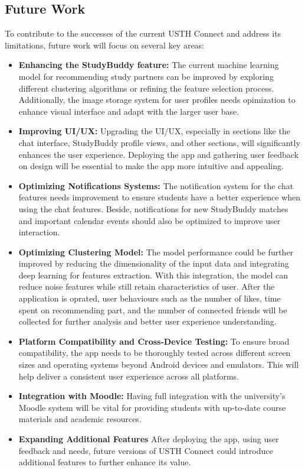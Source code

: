 \documentclass[12pt]{article}
\begin{document}
\subsection{Future Work}
To contribute to the successes of the current USTH Connect and address its limitations, future work will focus on several key areas:
\begin{itemize}
    \item \textbf{Enhancing the StudyBuddy feature: } The current machine learning model for recommending study partners can be improved by exploring different clustering algorithms or refining the feature selection process. Additionally, the image storage system for user profiles needs opimization to enhance visual interface and adapt with the larger user base.
    \item \textbf{Improving UI/UX: } Upgrading the UI/UX, especially in sections like the chat interface, StudyBuddy profile views, and other sections, will significantly enhances the user experience. Deploying the app and gathering user feedback on design will be essential to make the app more intuitive and appealing.
    \item \textbf{Optimizing Notifications Systems: } The notification system for the chat features needs improvement to ensure students have a better experience when using the chat features. Beside, notifications for new StudyBuddy matches and important calendar events should also be optimized to improve user interaction.
    \item \textbf{Optimizing Clustering Model: } The model performance could be further improved by reducing the dimensionality of the input data and integrating deep learning for features extraction. With this integration, the model can reduce noise features while still retain characteristics of user. After the application is oprated, user behaviours such as the number of likes, time spent on recommending part, and the number of connected friends will be collected for further analysis and better user experience understanding. 
    \item \textbf{Platform Compatibility and Cross-Device Testing: } To ensure broad compatibility, the app needs to be thoroughly tested across different screen sizes and operating systems beyond Android devices and emulators. This will help deliver a consistent user experience across all platforms.
    \item \textbf{Integration with Moodle: } Having full integration with the university's Moodle system will be vital for providing students with up-to-date course materials and academic resources.
    \item \textbf{Expanding Additional Features} After deploying the app, using user feedback and needs, future versions of USTH Connect could introduce additional features to further enhance its value.
\end{itemize}
\end{document}
